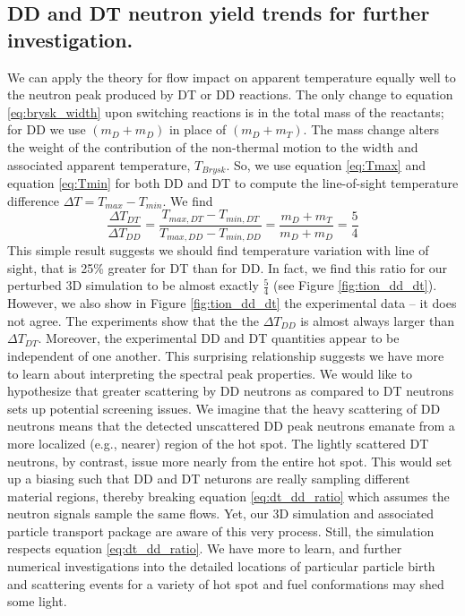 \documentclass[aip,pop,numerical,reprint,floatfix]{revtex4-1}
\begin{document}
\subsection{\label{sec:dd_dt_expts}DD and DT neutron yield trends for further investigation.  }

We can apply the theory for flow impact on apparent temperature equally
well to the neutron peak produced by DT or DD reactions. The only
change to equation \ref{eq:brysk_width} upon switching reactions is in the
total mass of the reactants; for DD we use $(m_{D}+m_{D})$ in place
of $(m_{D}+m_{T})$. The mass change alters the weight of the contribution
of the non-thermal motion to the width and associated apparent temperature,
$T_{Brysk}$. So, we use equation \ref{eq:Tmax} and equation \ref{eq:Tmin}
for both DD and DT to compute the line-of-sight temperature difference
$\Delta T=T_{max}-T_{min}$. We find
\begin{equation}
\frac{\Delta T_{DT}}{\Delta T_{DD}}=\frac{T_{max,DT}-T_{min,DT}}{T_{max,DD}-T_{min,DD}}=\frac{m_{D}+m_{T}}{m_{D}+m_{D}}=\frac{5}{4}
\label{eq:dt_dd_ratio}
\end{equation}
This simple result suggests we should find temperature variation with
line of sight, that is 25\% greater for DT than for DD. In fact, we
find this ratio for our perturbed 3D simulation to be almost exactly
$\frac{5}{4}$ (see Figure \ref{fig:tion_dd_dt}). However, we also show
in Figure \ref{fig:tion_dd_dt} the experimental data -- it does not agree.
The experiments show that the the $\Delta T_{DD}$ is almost always
larger than $\Delta T_{DT}$. Moreover, the experimental DD and DT
quantities appear to be independent of one another. This surprising
relationship suggests we have more to learn about interpreting the
spectral peak properties. We would like to hypothesize that greater
scattering by DD neutrons as compared to DT neutrons sets up potential
screening issues. We imagine that the heavy scattering of DD neutrons
means that the detected unscattered DD peak neutrons emanate from
a more localized (e.g., nearer) region of the hot spot. The lightly
scattered DT neutrons, by contrast, issue more nearly from the entire
hot spot. This would set up a biasing such that DD and DT neturons
are really sampling different material regions, thereby breaking equation \ref{eq:dt_dd_ratio}
which assumes the neutron signals sample the same flows. Yet, our
3D simulation and associated particle transport package are aware
of this very process. Still, the simulation respects equation \ref{eq:dt_dd_ratio}.
We have more to learn, and further numerical investigations into the
detailed locations of particular particle birth and scattering events
for a variety of hot spot and fuel conformations may shed some light. 
\end{document}
